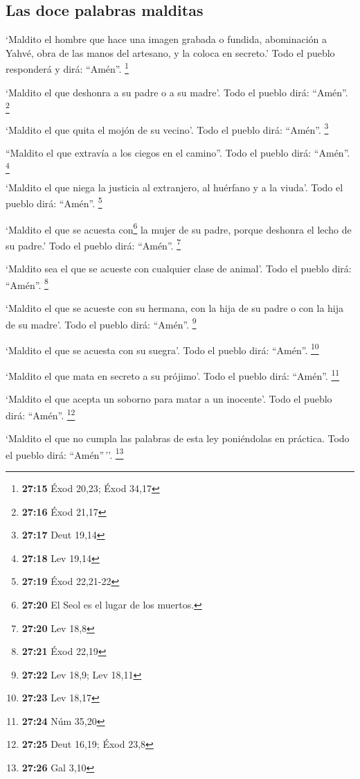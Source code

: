 \begin{paracol}{2}
\hypertarget{las-doce-palabras-malditas}{%
\subsection{Las doce palabras
malditas}\label{las-doce-palabras-malditas}}

 `Maldito el hombre que hace una imagen grabada o
fundida, abominación a Yahvé, obra de las manos del artesano, y la
coloca en secreto.' Todo el pueblo responderá y dirá: ``Amén''.
\footnote{\textbf{27:15} Éxod 20,23; Éxod 34,17}

 `Maldito el que deshonra a su padre o a su madre'. Todo
el pueblo dirá: ``Amén''. \footnote{\textbf{27:16} Éxod 21,17}

 `Maldito el que quita el mojón de su vecino'. Todo el
pueblo dirá: ``Amén''. \footnote{\textbf{27:17} Deut 19,14}

 ``Maldito el que extravía a los ciegos en el camino''.
Todo el pueblo dirá: ``Amén''. \footnote{\textbf{27:18} Lev 19,14}

 `Maldito el que niega la justicia al extranjero, al
huérfano y a la viuda'. Todo el pueblo dirá: ``Amén''. \footnote{\textbf{27:19}
  Éxod 22,21-22}

 `Maldito el que se acuesta con\footnote{\textbf{27:20}
  El Seol es el lugar de los muertos.} la mujer de su padre, porque
deshonra el lecho de su padre.' Todo el pueblo dirá: ``Amén''.
\footnote{\textbf{27:20} Lev 18,8}

 `Maldito sea el que se acueste con cualquier clase de
animal'. Todo el pueblo dirá: ``Amén''. \footnote{\textbf{27:21} Éxod
  22,19}

 `Maldito el que se acueste con su hermana, con la hija
de su padre o con la hija de su madre'. Todo el pueblo dirá: ``Amén''.
\footnote{\textbf{27:22} Lev 18,9; Lev 18,11}

 `Maldito el que se acuesta con su suegra'. Todo el
pueblo dirá: ``Amén''. \footnote{\textbf{27:23} Lev 18,17}

 `Maldito el que mata en secreto a su prójimo'. Todo el
pueblo dirá: ``Amén''. \footnote{\textbf{27:24} Núm 35,20}

 `Maldito el que acepta un soborno para matar a un
inocente'. Todo el pueblo dirá: ``Amén''. \footnote{\textbf{27:25} Deut
  16,19; Éxod 23,8}

 `Maldito el que no cumpla las palabras de esta ley
poniéndolas en práctica. Todo el pueblo dirá: ``Amén''\,''. \footnote{\textbf{27:26}
  Gal 3,10}


\end{paracol}
